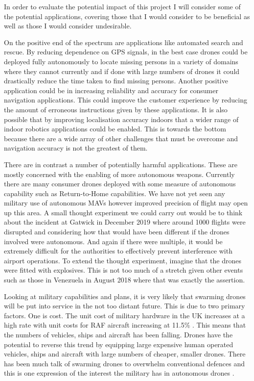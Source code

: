 \documentclass[]{../resources/final_report}
\begin{document}
In order to evaluate the potential impact of this project I will consider some of the potential applications, covering those that I would consider to be beneficial as well as those I would consider undesirable.
 
On the positive end of the spectrum are applications like automated search and rescue. By reducing dependence on GPS signals, in the best case drones could be deployed fully autonomously to locate missing persons in a variety of domains where they cannot currently and if done with large numbers of drones it could drastically reduce the time taken to find missing persons. Another positive application could be in increasing reliability and accuracy for consumer navigation applications. This could improve the customer experience by reducing the amount of erroneous instructions given by these applications. It is also possible that by improving localisation accuracy indoors that a wider range of indoor robotics applications could be enabled. This is towards the bottom because there are a wide array of other challenges that must be overcome and navigation accuracy is not the greatest of them.

There are in contrast a number of potentially harmful applications. These are mostly concerned with the enabling of more autonomous weapons. Currently there are many consumer drones deployed with some measure of autonomous capability such as Return-to-Home capabilities. We have not yet seen any military use of autonomous MAVs however improved precision of flight may open up this area. A small thought experiment we could carry out would be to think about the incident at Gatwick in December 2019 where around 1000 flights were disrupted \cite{Gatwick_Airport} and considering how that would have been different if the drones involved were autonomous. And again if there were multiple, it would be extremely difficult for the authorities to effectively prevent interference with airport operations. To extend the thought experiment, imagine that the drones were fitted with explosives. This is not too much of a stretch given other events such as those in Venezuela in August 2018 \cite{Caracas_drone} where that was exactly the assertion.

Looking at military capabilities and plans, it is very likely that swarming drones will be put into service in the not too distant future. This is due to two primary factors. One is cost. The unit cost of military hardware in the UK increases at a high rate with unit costs for RAF aircraft increasing at 11.5\% \cite{RUSI_defence_costs}. This means that the numbers of vehicles, ships and aircraft has been falling. Drones have the potential to reverse this trend by equipping large expensive human operated vehicles, ships and aircraft with large numbers of cheaper, smaller drones. There has been much talk of swarming drones to overwhelm conventional defences and this is one expression of the interest the military has in autonomous drones \cite{atherton_2019}\cite{kallenborn_bleek_2019}\cite{mcmullan_2019}\cite{peters_2019}\cite{safi_2019}\cite{tucker_2018}.
\end{document}
